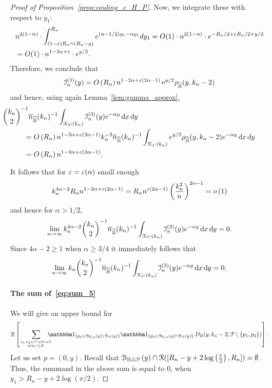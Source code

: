 \begin{proof}[Proof of Proposition~\ref{prop:couling_c_H_P}]
Now, we integrate these with respect to $y_1$:
\begin{align}
	&n^{2(1-\alpha)} \cdot \int_{(1-\varepsilon) R_n \wedge (R_n-y)}^{R_n} e^{(\alpha -1/2)y_1 - \alpha y_1} dy_1 
		=O(1) \cdot n^{2(1-\alpha)} \cdot e^{-R_n/2 + \varepsilon R_n/2  + y/2}  \\
	&= O(1) \cdot n^{1-2\alpha + \varepsilon} \cdot e^{y/2}.
\end{align}
Therefore, we conclude that
\[
	\mathcal{I}_n^{(3)}(y) = O\left(R_n\right) n^{1-2\alpha +\varepsilon(2\alpha -1)} \, e^{y/2} \rho_{\widetilde{\mathbb{H}}}(y,k_n-2)
\]
and hence, using again Lemma~\ref{lem:gamma_approx},
\begin{align*}
	&\hspace{-30pt}\binom{k_n}{2}^{-1} \expH^{-1} \int_{\Kcal_{C}(k_n)} \mathcal{I}_n^{(3)}(y) e^{-\alpha y} \dd x \dd y\\
	&= \bigO{R_n} n^{1-2\alpha +\eps(2\alpha -1)} k_n^{-2} \expH^{-1} \int_{\Kcal_{C}(k_n)} e^{y/2} 
		\rho_{\HP}(y,k_n-2) e^{-\alpha y} \dd x \dd y\\
	&= \bigO{R_n} n^{1-2\alpha +\eps(2\alpha -1)}.
\end{align*}

It follows that for $\varepsilon = \varepsilon(\alpha)$ small enough
\[
	k_n^{4\alpha - 2} R_n n^{1-2\alpha +\varepsilon(2\alpha -1)}
	= R_n n^{\varepsilon(2\alpha -1)} \left(\frac{k_n^2}{n}\right)^{2\alpha - 1} = o\left(1\right)
\]
and hence for $\alpha > 1/2$,
\[
	\lim_{n \to \infty} k_n^{4\alpha - 2} \binom{k_n}{2}^{-1} \overline{n}_{\widetilde{\mathbb{H}}}(k_n)^{-1} \int_{{\mathcal K}_{C}(k_n)} \mathcal{I}_n^{(3)}(y) e^{-\alpha y} \operatorname{\mathrm{d}\hspace{-2pt}} x \operatorname{\mathrm{d}\hspace{-2pt}} y = 0.
\]
Since $4\alpha - 2 \ge 1$ when $\alpha \ge 3/4$ it immediately follows that
\[
	\lim_{n \to \infty} k_n \binom{k_n}{2}^{-1} \overline{n}_{\widetilde{\mathbb{H}}}(k_n)^{-1} \int_{{\mathcal K}_{C}(k_n)} \mathcal{I}_n^{(3)}(y) e^{-\alpha y} \operatorname{\mathrm{d}\hspace{-2pt}} x \operatorname{\mathrm{d}\hspace{-2pt}} y = 0.
\]

\paragraph{The sum of~\eqref{eq:sum_5}}

We will give an upper bound for
\[
	\Exp{ \sum_{p_1,p_2 \in\Pcal \setminus \{(0,y)\} \atop y(p_1) \geq K} 
	\hspace{-10pt} \ind{p_1\in \BallHyp{y}\setminus \BallPo{y}} \ind{p_2\in \BallHyp{y}\cap \BallPo{y}} 
	\, D_\H (y,k_n-2;\Pcal \setminus \{ p_1,p_2\})}.
\]
Let us set $p=(0,y)$. Recall that ${\mathcal B}_{\mathbb{H} \bigtriangleup {\mathcal P}}\left(y\right)\cap {\mathcal R}([R_n - y + 2 \log\left(\frac{\pi}{2}\right),R_n]) = \emptyset$. Thus, the summand in the above sum is equal to 0, when 
$y_1 > R_n - y + 2 \log (\pi/2)$. 


\end{proof}
